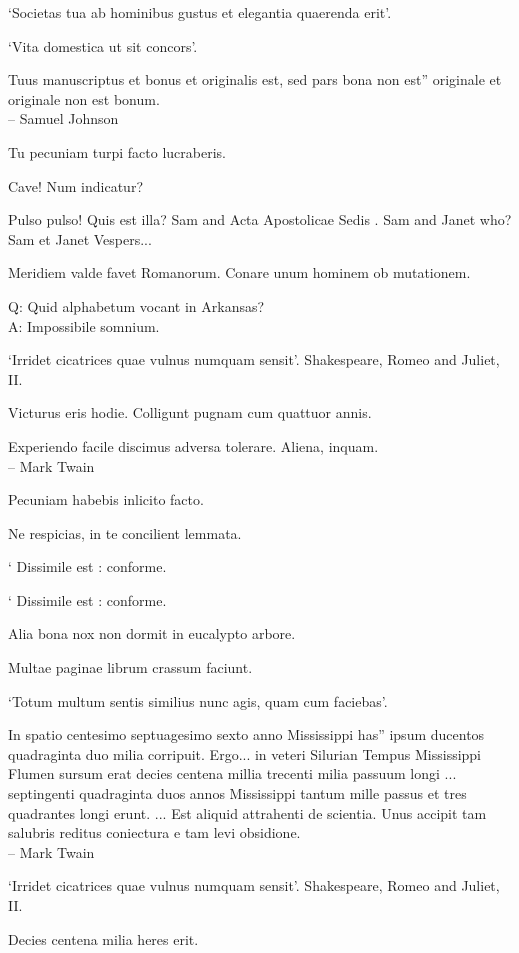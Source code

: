 \documentclass[titlepage,12pt]{memoir}
\begin{document}
‘Societas tua ab hominibus gustus et elegantia quaerenda erit’.

‘Vita domestica ut sit concors’.

Tuus manuscriptus et bonus et originalis est, sed pars bona non est”
originale et originale non est bonum.
\\-- Samuel Johnson

Tu pecuniam turpi facto lucraberis.

Cave! Num indicatur?

Pulso pulso!
Quis est illa?
Sam and Acta Apostolicae Sedis .
Sam and Janet who?
Sam et Janet Vespers...

Meridiem valde favet Romanorum. Conare unum hominem ob mutationem.

Q: Quid alphabetum vocant in Arkansas?\\
A: Impossibile somnium.

‘Irridet cicatrices quae vulnus numquam sensit’.
Shakespeare, Romeo and Juliet, II.

Victurus eris hodie. Colligunt pugnam cum quattuor annis.

Experiendo facile discimus adversa tolerare. Aliena, inquam.
\\-- Mark Twain

Pecuniam habebis inlicito facto.

Ne respicias, in te concilient lemmata.

‘ Dissimile est : conforme.

‘ Dissimile est : conforme.

Alia bona nox non dormit in eucalypto arbore.

Multae paginae librum crassum faciunt.

‘Totum multum sentis similius nunc agis, quam cum faciebas’.

In spatio centesimo septuagesimo sexto anno Mississippi has”
ipsum ducentos quadraginta duo milia corripuit. Ergo... in veteri
Silurian Tempus Mississippi Flumen sursum erat decies centena millia trecenti
milia passuum longi ... septingenti quadraginta duos annos
Mississippi tantum mille passus et tres quadrantes longi erunt. ... Est
aliquid attrahenti de scientia. Unus accipit tam salubris reditus
coniectura e tam levi obsidione.
\\-- Mark Twain

‘Irridet cicatrices quae vulnus numquam sensit’.
Shakespeare, Romeo and Juliet, II.

Decies centena milia heres erit.
\end{document}
